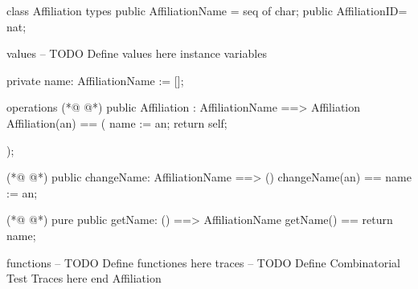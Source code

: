 \begin{vdmpp}[breaklines=true]
class Affiliation
types
public AffiliationName = seq of char;
public AffiliationID= nat;


values
-- TODO Define values here
instance variables

 private name: AffiliationName := [];



operations
(*@
\label{Affiliation:16}
@*)
 public Affiliation : AffiliationName  ==> Affiliation
  Affiliation(an) ==
  (
  name := an;
  return self;
  
  );
 
(*@
\label{changeName:24}
@*)
 public changeName: AffiliationName ==> ()
 changeName(an) ==
 name :=  an;
 

  
(*@
\label{getName:30}
@*)
 pure public getName: () ==> AffiliationName
  getName() == return name;



functions
-- TODO Define functiones here
traces
-- TODO Define Combinatorial Test Traces here
end Affiliation
\end{vdmpp}

